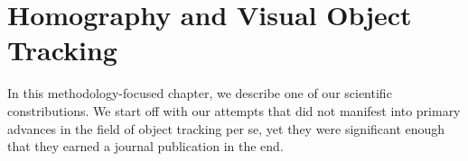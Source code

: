 \chapter{Homography and Visual Object Tracking}
\label{chap:HomographyAndVOT}

In this methodology-focused chapter, we describe one of our scientific constributions. We start off with our attempts that did not manifest into primary advances in the field of object tracking per se, yet they were significant enough that they earned a journal publication in the end.


